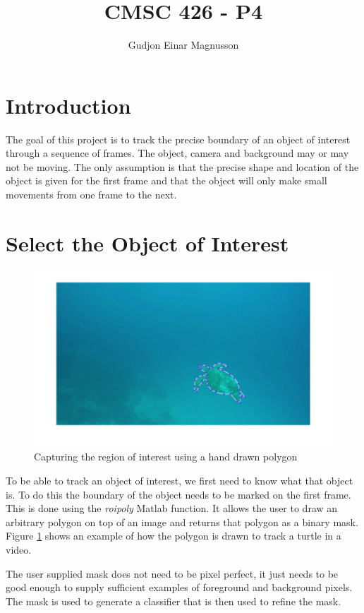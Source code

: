\documentclass[12pt]{article}
\begin{document}
\title{CMSC 426 - P4}
\author{Gudjon Einar Magnusson}

\maketitle

\section{Introduction}

The goal of this project is to track the precise boundary of an object of interest through a sequence of frames. The object, camera and background may or may not be moving. The only assumption is that the precise shape and location of the object is given for the first frame and that the object will only make small movements from one frame to the next.

\section{Select the Object of Interest}

\begin{figure}
	\centering
    \includegraphics[width=0.6\linewidth]{img/video1_mask1}
    \caption{Capturing the region of interest using a hand drawn polygon}
    \label{fig_roi1}
\end{figure}

To be able to track an object of interest, we first need to know what that object is. To do this the boundary of the object needs to be marked on the first frame. This is done using the \textit{roipoly} Matlab function. It allows the user to draw an arbitrary polygon on top of an image and returns that polygon as a binary mask. Figure \ref{fig_roi1} shows an example of how the polygon is drawn to track a turtle in a video.

The user supplied mask does not need to be pixel perfect, it just needs to be good enough to supply sufficient examples of foreground and background pixels. The mask is used to generate a classifier that is then used to refine the mask.
\end{document}
